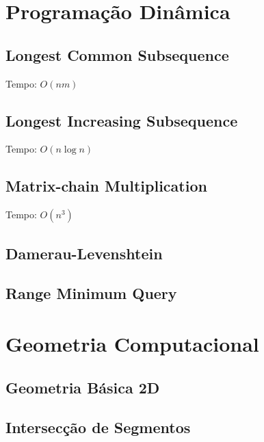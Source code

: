 \documentclass[12pt,a4paper]{article}
\begin{document}
	\section{Programação Dinâmica}
		\subsection{Longest Common Subsequence}
			Tempo: \( O(nm) \)
			
		\subsection{Longest Increasing Subsequence}
			Tempo: \( O(n \log n) \)
			
		\subsection{Matrix-chain Multiplication}
			Tempo: \( O(n^3) \)
			
		\subsection{Damerau-Levenshtein}
			
		\subsection{Range Minimum Query}
			
	\section{Geometria Computacional}
		
		\subsection{Geometria Básica 2D}
			
		\subsection{Intersecção de Segmentos}
			
\end{document}

